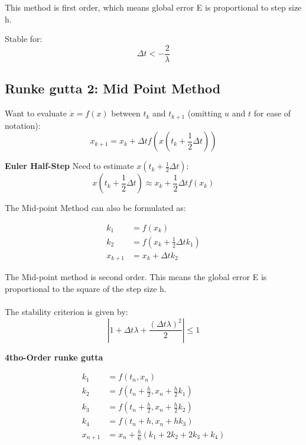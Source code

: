 This method is first order, which means global error E is proportional to step size h. 

Stable for: \[\Delta t < - \frac{2}{\lambda}\]

\subsection{Runke gutta 2: Mid Point Method }

Want to evaluate \(\dot{x} = f(x)\) between \(t_k\) and \(t_{k+1}\) (omitting \(u\) and \(t\) for ease of notation):
\begin{equation}
x_{k+1} = x_k + \Delta t f\left( x \left( t_k + \frac{1}{2} \Delta t \right) \right)
\end{equation}

\textbf{Euler Half-Step}
Need to estimate \(x \left( t_k + \frac{1}{2} \Delta t \right)\):
\begin{equation}
x \left( t_k + \frac{1}{2} \Delta t \right) \approx x_k + \frac{1}{2} \Delta t f(x_k)
\end{equation}

The Mid-point Method can also be formulated as:

\begin{align}
k_1 &= f(x_k) \\
k_2 &= f\left(x_k + \frac{1}{2} \Delta t k_1\right) \\
x_{k+1} &= x_k + \Delta t k_2
\end{align}

The Mid-point method is second order.  This means the global error E is proportional to the square of the step size h.
\\
\\
The stability criterion is given by:
\begin{equation}
\left| 1 + \Delta t \lambda + \frac{(\Delta t \lambda)^2}{2} \right| \leq 1
\end{equation}

\textbf{4tho-Order runke gutta }

\begin{align}
k_1 &= f(t_n, x_n) \\
k_2 &= f\left(t_n + \frac{h}{2}, x_n + \frac{h}{2} k_1\right) \\
k_3 &= f\left(t_n + \frac{h}{2}, x_n + \frac{h}{2} k_2\right) \\
k_4 &= f(t_n + h, x_n + h k_3) \\
x_{n+1} &= x_n + \frac{h}{6} \left( k_1 + 2k_2 + 2k_3 + k_4 \right)
\end{align}

